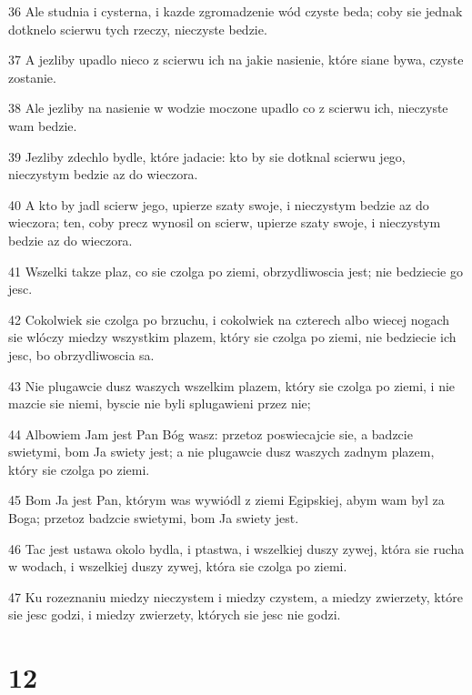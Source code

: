 \par 36 Ale studnia i cysterna, i kazde zgromadzenie wód czyste beda; coby sie jednak dotknelo scierwu tych rzeczy, nieczyste bedzie.
\par 37 A jezliby upadlo nieco z scierwu ich na jakie nasienie, które siane bywa, czyste zostanie.
\par 38 Ale jezliby na nasienie w wodzie moczone upadlo co z scierwu ich, nieczyste wam bedzie.
\par 39 Jezliby zdechlo bydle, które jadacie: kto by sie dotknal scierwu jego, nieczystym bedzie az do wieczora.
\par 40 A kto by jadl scierw jego, upierze szaty swoje, i nieczystym bedzie az do wieczora; ten, coby precz wynosil on scierw, upierze szaty swoje, i nieczystym bedzie az do wieczora.
\par 41 Wszelki takze plaz, co sie czolga po ziemi, obrzydliwoscia jest; nie bedziecie go jesc.
\par 42 Cokolwiek sie czolga po brzuchu, i cokolwiek na czterech albo wiecej nogach sie wlóczy miedzy wszystkim plazem, który sie czolga po ziemi, nie bedziecie ich jesc, bo obrzydliwoscia sa.
\par 43 Nie plugawcie dusz waszych wszelkim plazem, który sie czolga po ziemi, i nie mazcie sie niemi, byscie nie byli splugawieni przez nie;
\par 44 Albowiem Jam jest Pan Bóg wasz: przetoz poswiecajcie sie, a badzcie swietymi, bom Ja swiety jest; a nie plugawcie dusz waszych zadnym plazem, który sie czolga po ziemi.
\par 45 Bom Ja jest Pan, którym was wywiódl z ziemi Egipskiej, abym wam byl za Boga; przetoz badzcie swietymi, bom Ja swiety jest.
\par 46 Tac jest ustawa okolo bydla, i ptastwa, i wszelkiej duszy zywej, która sie rucha w wodach, i wszelkiej duszy zywej, która sie czolga po ziemi.
\par 47 Ku rozeznaniu miedzy nieczystem i miedzy czystem, a miedzy zwierzety, które sie jesc godzi, i miedzy zwierzety, których sie jesc nie godzi.

\chapter{12}

